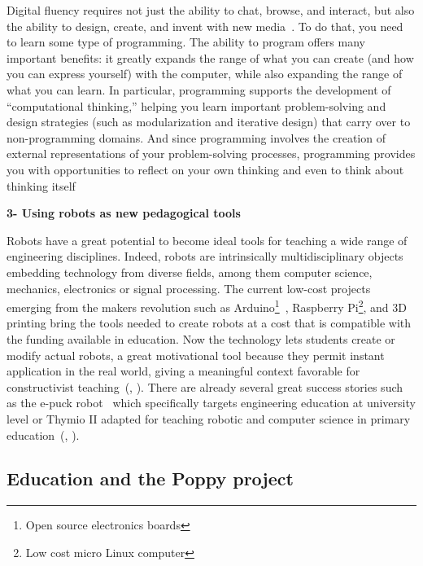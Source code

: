 \begin{formal}
    Digital fluency requires not just the ability to chat, browse, and interact, but also the ability to design, create, and invent with new media~\parencite{resnick2008sowing}. To do that, you need to learn some type of programming. The ability to program offers many important benefits: it greatly expands the range of what you can create (and how you can express yourself) with the computer, while also expanding the range of what you can learn. In particular, programming supports the development of “computational thinking,” helping you learn important problem-solving and design strategies (such as modularization and iterative design) that carry over to non-programming domains. And since programming involves the creation of external representations of your problem-solving processes, programming provides you with opportunities to reflect on your own thinking and even to think about thinking itself~\parencite{disessa2001changing}

\end{formal}


\textbf{3- Using robots as new pedagogical tools}

Robots have a great potential to become ideal tools for teaching a wide range of engineering disciplines. Indeed, robots are intrinsically multidisciplinary objects embedding technology from diverse fields, among them computer science, mechanics, electronics or signal processing.
The current low-cost projects emerging from the makers revolution\parencite{anderson2012makers} such as Arduino\footnote{Open source electronics boards}~\parencite{mellis2007arduino}, Raspberry Pi\footnote{Low cost micro Linux computer}, and 3D printing bring the tools needed to create robots at a cost that is compatible with the funding available in education. Now the technology lets students create or modify actual robots, a great motivational tool because they permit instant application in the real world, giving a meaningful context favorable for constructivist teaching~(\cite{palincsar1998social}, \cite{papert1991situating}).
There are already several great success stories such as the e-puck robot~\parencite{mondada2009puck} which specifically targets engineering education at university level or Thymio II adapted for teaching robotic and computer science in primary education~(\cite{riedo2012two}, \cite{riedo2013thymio}).


\subsection{Education and the Poppy project} %

